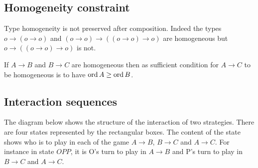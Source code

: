 \subsection{Homogeneity constraint}

Type homogeneity is not preserved after composition. Indeed the types  $o \longrightarrow (o \rightarrow o)$ and $(o \rightarrow o) \longrightarrow \left((o \rightarrow o) \rightarrow o \right)$ are homogeneous
but $o \longrightarrow \left((o \rightarrow o) \rightarrow o\right)$ is not.

If $A\rightarrow B$ and $B \rightarrow C$ are homogeneous then 
as sufficient condition for $A\rightarrow C$ to be homogeneous is to have $\mathop{\mathrm{ord}}{A} \geq \mathop{\mathrm{ord}}{B}$.

\subsection{Interaction sequences}

The diagram below shows the structure of the interaction of two strategies. There are four states represented by the rectangular boxes. The content of the state shows who is to play in each of the game $A\rightarrow B$, $B\rightarrow C$ and $A\rightarrow C$.
For instance in state $OPP$, it is O's turn to play in 
$A\rightarrow B$ and P's turn to play in $B\rightarrow C$ and $A\rightarrow C$.

